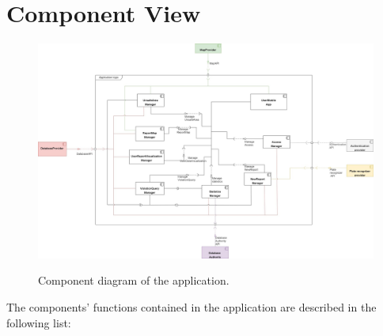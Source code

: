 \documentclass[../RASD.tex]{subfiles}
\begin{document}
    \section{Component View}\label{sec:component-view}
    \begin{figure}[H]
        \centering
        \includegraphics[scale = 1]{assets/component.png}\\[1.6 cm]
        \caption[\textit{Component} Diagram]{Component diagram of the application.}
    \end{figure}
    The components’ functions contained in the application are described in the following list:
\end{document}
